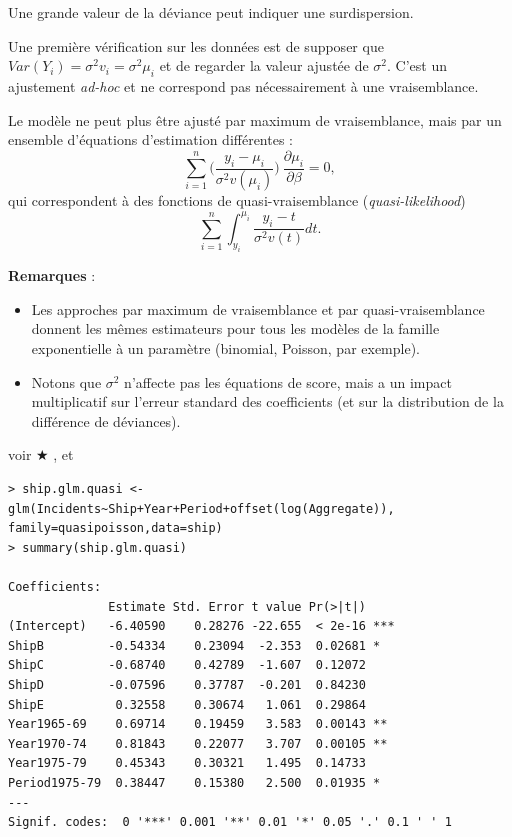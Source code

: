 \documentclass{BeamerTemplate}
\begin{document}
\begin{refsection}
\begin{frame}{}
\bigskip
Une grande valeur de la déviance peut indiquer une surdispersion.

\bigskip
Une première vérification sur les données est de supposer que $Var(Y_i) = \sigma^2
v_i = \sigma^2 \mu_i$ et de regarder la valeur ajustée de $\sigma^2$. C'est un
ajustement \textit{ad-hoc} et ne correspond pas nécessairement à une
vraisemblance.
\end{frame}

\begin{frame}{}
Le modèle ne peut plus être ajusté par maximum de vraisemblance, mais par un
ensemble d'équations d'estimation différentes :
$$\sum_{i=1}^n \Big(\frac{y_i-\mu_i}{\sigma^2 v(\mu_i)}\Big) \ \frac{\partial
  \mu_i}{\partial \beta}=0,$$
qui correspondent à des fonctions de quasi-vraisemblance (\textit{quasi-likelihood})
$$\sum_{i=1}^n \int_{y_i}^{\mu_i} \frac{y_i-t}{\sigma^2 v(t)} dt.$$
\label{QL.page}
\end{frame}

\begin{frame}{}
\textbf{Remarques} :
\begin{itemize}
\item Les approches par maximum de vraisemblance et par quasi-vraisemblance donnent les mêmes
estimateurs pour tous les modèles de la famille exponentielle à un paramètre (binomial,
Poisson, par exemple).
\item Notons que $\sigma^2$ n'affecte pas les équations de score, mais
  a un impact multiplicatif sur l'erreur standard des coefficients (et sur la 
  distribution de la différence de déviances).
\end{itemize}

\bigskip
{voir \color{red} $\bigstar$ ,  et }
\end{frame}

\begin{frame}[fragile]{}
\label{shipmodel.page}

{\scriptsize
\begin{verbatim}
> ship.glm.quasi <- glm(Incidents~Ship+Year+Period+offset(log(Aggregate)),
family=quasipoisson,data=ship)
> summary(ship.glm.quasi)

Coefficients:
              Estimate Std. Error t value Pr(>|t|)    
(Intercept)   -6.40590    0.28276 -22.655  < 2e-16 ***
ShipB         -0.54334    0.23094  -2.353  0.02681 *  
ShipC         -0.68740    0.42789  -1.607  0.12072    
ShipD         -0.07596    0.37787  -0.201  0.84230    
ShipE          0.32558    0.30674   1.061  0.29864    
Year1965-69    0.69714    0.19459   3.583  0.00143 ** 
Year1970-74    0.81843    0.22077   3.707  0.00105 ** 
Year1975-79    0.45343    0.30321   1.495  0.14733    
Period1975-79  0.38447    0.15380   2.500  0.01935 *  
---
Signif. codes:  0 '***' 0.001 '**' 0.01 '*' 0.05 '.' 0.1 ' ' 1


\end{verbatim}}
\end{frame}
\end{refsection}
\end{document}
